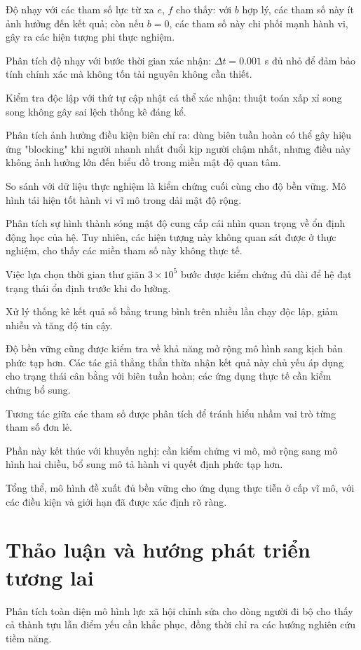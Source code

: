 \documentclass[12pt,a4paper]{article}
\begin{document}
Độ nhạy với các tham số lực từ xa $e$, $f$ cho thấy: với $b$ hợp lý, các tham số này ít ảnh hưởng đến kết quả; còn nếu $b = 0$, các tham số này chi phối mạnh hành vi, gây ra các hiện tượng phi thực nghiệm.

Phân tích độ nhạy với bước thời gian xác nhận: $\Delta t = 0.001$ s đủ nhỏ để đảm bảo tính chính xác mà không tốn tài nguyên không cần thiết.

Kiểm tra độc lập với thứ tự cập nhật cá thể xác nhận: thuật toán xấp xỉ song song không gây sai lệch thống kê đáng kể.

Phân tích ảnh hưởng điều kiện biên chỉ ra: dùng biên tuần hoàn có thể gây hiệu ứng "blocking" khi người nhanh nhất đuổi kịp người chậm nhất, nhưng điều này không ảnh hưởng lớn đến biểu đồ trong miền mật độ quan tâm.

So sánh với dữ liệu thực nghiệm là kiểm chứng cuối cùng cho độ bền vững. Mô hình tái hiện tốt hành vi vĩ mô trong dải mật độ rộng.

Phân tích sự hình thành sóng mật độ cung cấp cái nhìn quan trọng về ổn định động học của hệ. Tuy nhiên, các hiện tượng này không quan sát được ở thực nghiệm, cho thấy các miền tham số này không thực tế.

Việc lựa chọn thời gian thư giãn $3 \times 10^5$ bước được kiểm chứng đủ dài để hệ đạt trạng thái ổn định trước khi đo lường.

Xử lý thống kê kết quả số bằng trung bình trên nhiều lần chạy độc lập, giảm nhiễu và tăng độ tin cậy.

Độ bền vững cũng được kiểm tra về khả năng mở rộng mô hình sang kịch bản phức tạp hơn. Các tác giả thẳng thắn thừa nhận kết quả này chủ yếu áp dụng cho trạng thái cân bằng với biên tuần hoàn; các ứng dụng thực tế cần kiểm chứng bổ sung.

Tương tác giữa các tham số được phân tích để tránh hiểu nhầm vai trò từng tham số đơn lẻ.

Phần này kết thúc với khuyến nghị: cần kiểm chứng vi mô, mở rộng sang mô hình hai chiều, bổ sung mô tả hành vi quyết định phức tạp hơn.

Tổng thể, mô hình đề xuất đủ bền vững cho ứng dụng thực tiễn ở cấp vĩ mô, với các điều kiện và giới hạn đã được xác định rõ ràng.

\section{Thảo luận và hướng phát triển tương lai}

Phân tích toàn diện mô hình lực xã hội chỉnh sửa cho dòng người đi bộ cho thấy cả thành tựu lẫn điểm yếu cần khắc phục, đồng thời chỉ ra các hướng nghiên cứu tiềm năng.
\end{document}
